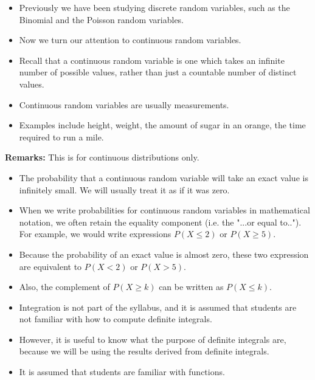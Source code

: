 \documentclass[12pt]{report}
\begin{document}
{%
\begin{itemize}
	\item Previously we have been studying discrete random variables, such as the Binomial and the Poisson random variables.
	\item Now we turn our attention to continuous random variables.
	\item Recall that a continuous random variable is one which takes an infinite number of possible values, rather than just a countable number of distinct values.
	\item Continuous random variables are usually measurements.
	\item Examples include height, weight, the amount of sugar in an orange, the time required to run a mile.
\end{itemize}
{\LARGE
	\large
	\textbf{Remarks:} This is for continuous distributions only.
	\begin{itemize}
		\item The probability that a continuous random variable will take an exact value is infinitely small.
		We will usually treat it as if it was zero.
		\item
		When we write probabilities for continuous random variables in mathematical notation, we often retain the equality component (i.e. the "...or equal to..").\\
		For example, we would write expressions $P(X \leq 2)$ or $P(X \geq 5)$.
		\item
		Because the probability of an exact value is almost zero, these two expression are equivalent to $P(X < 2)$
		or $P(X > 5)$. \item Also, the complement of $P(X \geq k)$ can be written as $P(X \leq k)$.
	\end{itemize}
}
\begin{itemize}
	\item Integration is not part of the syllabus, and it is assumed that students are not familiar with how to compute definite integrals.
	\item However,  it is useful to know what the purpose of definite integrals are, because we will be using the results derived from definite integrals. \item It is assumed that students are familiar with functions.
\end{itemize}

}
\end{document}
